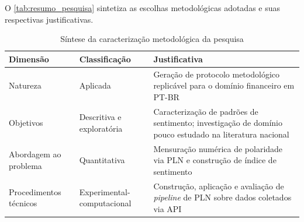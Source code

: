 O \autoref{tab:resumo_pesquisa} sintetiza as escolhas metodológicas adotadas e suas respectivas justificativas.

\begin{table}[htb]
	\caption{Síntese da caracterização metodológica da pesquisa}
	\label{tab:resumo_pesquisa}
	\begin{tabular}{p{3.5cm}p{3.5cm}p{8cm}}
		\hline
		\textbf{Dimensão} & \textbf{Classificação} & \textbf{Justificativa} \\
		\hline
		Natureza & Aplicada & Geração de protocolo metodológico replicável para o domínio financeiro em PT-BR \\
		\hline
		Objetivos & Descritiva e exploratória & Caracterização de padrões de sentimento; investigação de domínio pouco estudado na literatura nacional \\
		\hline
		Abordagem ao problema & Quantitativa & Mensuração numérica de polaridade via PLN e construção de índice de sentimento \\
		\hline
		Procedimentos técnicos & Experimental-computacional & Construção, aplicação e avaliação de \textit{pipeline} de PLN sobre dados coletados via API \\
		\hline
	\end{tabular}
\end{table}
